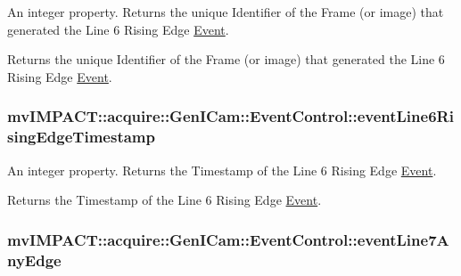 An integer property. Returns the unique Identifier of the Frame (or image) that generated the Line 6 Rising Edge \hyperlink{classmv_i_m_p_a_c_t_1_1acquire_1_1_event}{Event}. 

Returns the unique Identifier of the Frame (or image) that generated the Line 6 Rising Edge \hyperlink{classmv_i_m_p_a_c_t_1_1acquire_1_1_event}{Event}. \hypertarget{classmv_i_m_p_a_c_t_1_1acquire_1_1_gen_i_cam_1_1_event_control_a4e8f70d461b26b6cdc6d0319eebf1d14}{
\subsubsection[{event\+Line6\+Rising\+Edge\+Timestamp}]{ mv\+I\+M\+P\+A\+C\+T\+::acquire\+::\+Gen\+I\+Cam\+::\+Event\+Control\+::event\+Line6\+Rising\+Edge\+Timestamp}}\label{classmv_i_m_p_a_c_t_1_1acquire_1_1_gen_i_cam_1_1_event_control_a4e8f70d461b26b6cdc6d0319eebf1d14}


An integer property. Returns the Timestamp of the Line 6 Rising Edge \hyperlink{classmv_i_m_p_a_c_t_1_1acquire_1_1_event}{Event}. 

Returns the Timestamp of the Line 6 Rising Edge \hyperlink{classmv_i_m_p_a_c_t_1_1acquire_1_1_event}{Event}. \hypertarget{classmv_i_m_p_a_c_t_1_1acquire_1_1_gen_i_cam_1_1_event_control_acdd1accf26999051fc3c90321d00a9c2}{
\subsubsection[{event\+Line7\+Any\+Edge}]{ mv\+I\+M\+P\+A\+C\+T\+::acquire\+::\+Gen\+I\+Cam\+::\+Event\+Control\+::event\+Line7\+Any\+Edge}}\label{classmv_i_m_p_a_c_t_1_1acquire_1_1_gen_i_cam_1_1_event_control_acdd1accf26999051fc3c90321d00a9c2}


